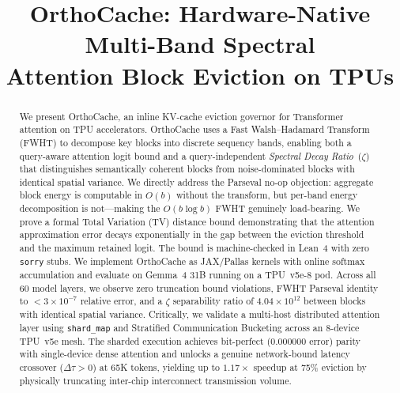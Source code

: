 \documentclass[conference,10pt]{IEEEtran}
\begin{document}
\title{OrthoCache: Hardware-Native Multi-Band Spectral\\Attention Block Eviction on TPUs}

\author{
}

\maketitle

\begin{abstract}
We present OrthoCache, an inline KV-cache eviction governor for Transformer
attention on TPU accelerators. OrthoCache uses a Fast Walsh--Hadamard Transform
(FWHT) to decompose key blocks into discrete sequency bands, enabling both a
query-aware attention logit bound and a query-independent \emph{Spectral Decay
Ratio}~($\zeta$) that distinguishes semantically coherent blocks from
noise-dominated blocks with identical spatial variance. We directly address the
Parseval no-op objection: aggregate block energy is computable in $O(b)$
without the transform, but per-band energy decomposition is not---making the
$O(b \log b)$ FWHT genuinely load-bearing. We prove a formal Total Variation
(TV) distance bound demonstrating that the attention approximation error decays
exponentially in the gap between the eviction threshold and the maximum retained
logit. The bound is machine-checked in Lean~4 with zero \texttt{sorry} stubs.
We implement OrthoCache as JAX/Pallas kernels with online softmax accumulation
and evaluate on Gemma~4 31B running on a TPU~v5e-8 pod. Across all 60 model layers,
we observe zero truncation bound violations, FWHT Parseval identity to $< 3 \times 10^{-7}$
relative error, and a $\zeta$ separability ratio of $4.04 \times 10^{12}$ between
blocks with identical spatial variance. Critically, we validate a multi-host
distributed attention layer using \texttt{shard\_map} and Stratified Communication
Bucketing across an 8-device TPU~v5e mesh. The sharded execution achieves bit-perfect
($0.000000$ error) parity with single-device dense attention and unlocks a genuine
network-bound latency crossover ($\Delta\tau > 0$) at 65K tokens, yielding up to
$1.17\times$ speedup at 75\% eviction by physically truncating inter-chip interconnect
transmission volume.
\end{abstract}
\end{document}
